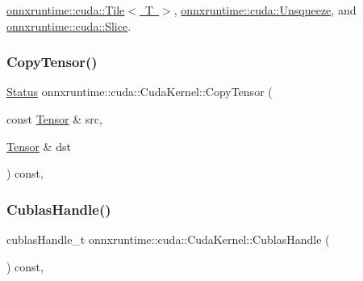 \mbox{\hyperlink{structonnxruntime_1_1cuda_1_1Tile_ad8a7d4e9aef2faec8891579f188ae6dd}{onnxruntime\+::cuda\+::\+Tile$<$ T $>$}}, \mbox{\hyperlink{classonnxruntime_1_1cuda_1_1Unsqueeze_acb3d90ba25a9dbc3c4feb1af6ec4664a}{onnxruntime\+::cuda\+::\+Unsqueeze}}, and \mbox{\hyperlink{classonnxruntime_1_1cuda_1_1Slice_a2726a33736da2c094d5f7eec39f86abc}{onnxruntime\+::cuda\+::\+Slice}}.

\mbox{\label{classonnxruntime_1_1cuda_1_1CudaKernel_a045d2367220e7756805c0079a3165925}} 
\subsubsection{\texorpdfstring{Copy\+Tensor()}{CopyTensor()}}
{\footnotesize\ttfamily \mbox{\hyperlink{classonnxruntime_1_1common_1_1Status}{Status}} onnxruntime\+::cuda\+::\+Cuda\+Kernel\+::\+Copy\+Tensor (\begin{DoxyParamCaption}\item[{const \mbox{\hyperlink{classonnxruntime_1_1Tensor}{Tensor}} \&}]{src,  }\item[{\mbox{\hyperlink{classonnxruntime_1_1Tensor}{Tensor}} \&}]{dst }\end{DoxyParamCaption}) const\hspace{0.3cm}{\ttfamily [inline]}, {\ttfamily [protected]}}

\mbox{\label{classonnxruntime_1_1cuda_1_1CudaKernel_a7720970f9afec128e98318aee7274c0a}} 
\subsubsection{\texorpdfstring{Cublas\+Handle()}{CublasHandle()}}
{\footnotesize\ttfamily cublas\+Handle\+\_\+t onnxruntime\+::cuda\+::\+Cuda\+Kernel\+::\+Cublas\+Handle (\begin{DoxyParamCaption}{ }\end{DoxyParamCaption}) const\hspace{0.3cm}{\ttfamily [inline]}, {\ttfamily [protected]}}

